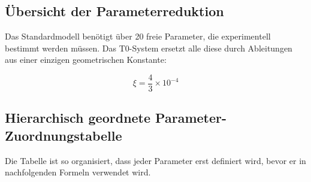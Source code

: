 \documentclass[12pt,a4paper]{article}
\theoremstyle{definition}
\begin{document}
\subsection{Übersicht der Parameterreduktion}
\label{subsec:parameter_overview}

Das Standardmodell benötigt über 20 freie Parameter, die experimentell bestimmt werden müssen. Das T0-System ersetzt alle diese durch Ableitungen aus einer einzigen geometrischen Konstante:

\begin{equation}
	\boxed{\xi = \frac{4}{3} \times 10^{-4}}
\end{equation}

\subsection{Hierarchisch geordnete Parameter-Zuordnungstabelle}
\label{subsec:hierarchical_mapping}

Die Tabelle ist so organisiert, dass jeder Parameter erst definiert wird, bevor er in nachfolgenden Formeln verwendet wird.
\end{document}
